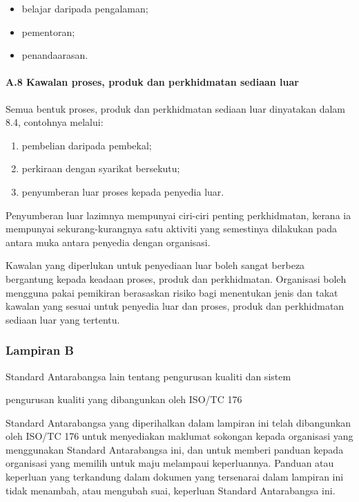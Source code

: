 \documentclass[
]{article}
\providecommand{\tightlist}{%
  \setlength{\itemsep}{0pt}\setlength{\parskip}{0pt}}
\begin{document}
\begin{itemize}
\tightlist
\item
  belajar daripada pengalaman;
\item
  pementoran;
\item
  penandaarasan.
\end{itemize}

\hypertarget{a.8-kawalan-proses-produk-dan-perkhidmatan-sediaan-luar}{%
\paragraph{A.8 Kawalan proses, produk dan perkhidmatan sediaan
luar}\label{a.8-kawalan-proses-produk-dan-perkhidmatan-sediaan-luar}}

Semua bentuk proses, produk dan perkhidmatan sediaan luar dinyatakan
dalam 8.4, contohnya melalui:

\begin{enumerate}
\def\labelenumi{\alph{enumi})}
\item
  pembelian daripada pembekal;
\item
  perkiraan dengan syarikat bersekutu;
\item
  penyumberan luar proses kepada penyedia luar.
\end{enumerate}

Penyumberan luar lazimnya mempunyai ciri-ciri penting perkhidmatan,
kerana ia mempunyai sekurang-kurangnya satu aktiviti yang semestinya
dilakukan pada antara muka antara penyedia dengan organisasi.

Kawalan yang diperlukan untuk penyediaan luar boleh sangat berbeza
bergantung kepada keadaan proses, produk dan perkhidmatan. Organisasi
boleh mengguna pakai pemikiran berasaskan risiko bagi menentukan jenis
dan takat kawalan yang sesuai untuk penyedia luar dan proses, produk dan
perkhidmatan sediaan luar yang tertentu.

\hypertarget{lampiran-b}{%
\subsubsection{Lampiran B}\label{lampiran-b}}

Standard Antarabangsa lain tentang pengurusan kualiti dan sistem

pengurusan kualiti yang dibangunkan oleh ISO/TC 176

Standard Antarabangsa yang diperihalkan dalam lampiran ini telah
dibangunkan oleh ISO/TC 176 untuk menyediakan maklumat sokongan kepada
organisasi yang menggunakan Standard Antarabangsa ini, dan untuk memberi
panduan kepada organisasi yang memilih untuk maju melampaui
keperluannya. Panduan atau keperluan yang terkandung dalam dokumen yang
tersenarai dalam lampiran ini tidak menambah, atau mengubah suai,
keperluan Standard Antarabangsa ini.
\end{document}
